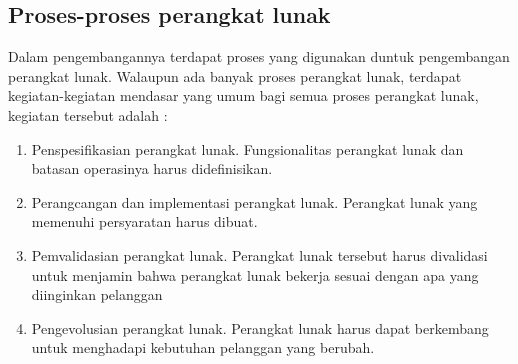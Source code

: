 \subsection{Proses-proses perangkat lunak}
Dalam pengembangannya terdapat proses yang digunakan duntuk pengembangan perangkat lunak. Walaupun ada banyak proses perangkat lunak, terdapat kegiatan-kegiatan mendasar yang umum bagi semua proses perangkat lunak, kegiatan tersebut adalah :
\begin{enumerate}
\item Penspesifikasian perangkat lunak. Fungsionalitas perangkat lunak dan batasan operasinya harus didefinisikan.
\item Perangcangan dan implementasi perangkat lunak. Perangkat lunak yang memenuhi persyaratan harus dibuat.
\item Pemvalidasian perangkat lunak. Perangkat lunak tersebut harus divalidasi untuk menjamin bahwa perangkat lunak bekerja sesuai dengan apa yang diinginkan pelanggan
\item Pengevolusian perangkat lunak. Perangkat lunak harus dapat berkembang untuk menghadapi kebutuhan pelanggan yang berubah.
\end{enumerate}
